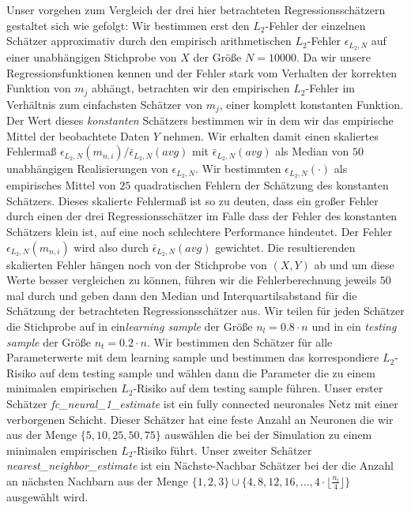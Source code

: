 Unser vorgehen zum Vergleich der drei hier betrachteten Regressionsschätzern gestaltet sich wie gefolgt:
Wir bestimmen erst den $L_2$-Fehler der einzelnen Schätzer approximativ durch den empirisch arithmetischen $L_2$-Fehler $\epsilon_{L_2,N}$ auf einer unabhängigen Stichprobe von $X$ der Größe $N = 10000$. Da wir unsere Regressionsfunktionen kennen und der Fehler stark vom Verhalten der korrekten Funktion von $m_j$ abhängt, betrachten wir den empirischen $L_2$-Fehler im Verhältnis zum einfachsten Schätzer von $m_j$, einer komplett konstanten Funktion. Der Wert dieses \textit{konstanten} Schätzers bestimmen wir in dem wir das empirische Mittel der beobachtete Daten $Y$ nehmen. Wir erhalten damit einen skaliertes Fehlermaß $\epsilon_{L_2,N}(m_{n,i})/\bar{\epsilon}_{L_2,N}(avg)$ mit $\bar{\epsilon}_{L_2,N}(avg)$ als Median von $50$ unabhängigen Realisierungen von $\epsilon_{L_2,N}$. Wir bestimmten $\epsilon_{L_2,N}(\cdot)$ als empirisches Mittel von $25$ quadratischen Fehlern der Schätzung des konstanten Schätzers. Dieses skalierte Fehlermaß ist so zu deuten, dass ein großer Fehler durch einen der drei Regressionsschätzer im Falle dass der Fehler des konstanten Schätzers klein ist, auf eine noch schlechtere Performance hindeutet. Der Fehler $\epsilon_{L_2,N}(m_{n,i})$ wird also durch $\bar{\epsilon}_{L_2,N}(avg)$ gewichtet.
Die resultierenden skalierten Fehler hängen noch von der Stichprobe von $(X, Y)$ ab und um diese Werte besser vergleichen zu können, führen wir die Fehlerberechnung jeweils $50$ mal durch und geben dann den Median und Interquartilsabstand für die Schätzung der betrachteten Regressionsschätzer aus.
Wir teilen für jeden Schätzer die Stichprobe auf in ein\textit{learning sample} der Größe $n_l = 0.8 \cdot n$ und in ein \textit{testing sample} der Größe $n_t = 0.2 \cdot n$. Wir bestimmen den Schätzer für alle Parameterwerte mit dem learning sample und bestimmen das korrespondiere $L_2$-Risiko auf dem testing sample und wählen dann die Parameter die zu einem minimalen empirischen $L_2$-Risiko auf dem testing sample führen.
Unser erster Schätzer \textit{fc\_neural\_1\_estimate} ist ein fully connected neuronales Netz mit einer verborgenen Schicht. Dieser Schätzer hat eine feste Anzahl an Neuronen die wir aus der Menge $\{5, 10, 25, 50, 75\}$ auswählen die bei der Simulation zu einem minimalen empirischen $L_2$-Risiko führt.
Unser zweiter Schätzer \textit{nearest\_neighbor\_estimate} ist ein Nächste-Nachbar Schätzer bei der die Anzahl an nächsten Nachbarn aus der Menge $\{1, 2, 3\} \cup \{4, 8, 12, 16, \dots, 4 \cdot \lfloor\frac{n_l}{4}\rfloor\}$ ausgewählt wird.
